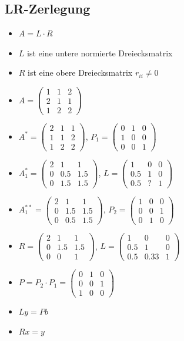 \documentclass[6pt,a4paper]{scrartcl}
\begin{document}
\begin{multicols*}{4}
		\subsection{LR-Zerlegung}	
			\begin{itemize}\itemsep0pt				
				\item $A = L \cdot R$
				\item $L$ ist eine untere normierte Dreiecksmatrix
				\item $R$ ist eine obere Dreiecksmatrix $r_{ii} \neq 0$
				\item $A=\begin{pmatrix}1&1&2\\2&1&1\\1&2&2\end{pmatrix}$
				\item  $A^{*}=\begin{pmatrix}2&1&1\\1&1&2\\1&2&2\end{pmatrix}$, $P_{1}=\begin{pmatrix}0&1&0\\1&0&0\\0&0&1\end{pmatrix}$
				\item $A_{1}^{*}=\begin{pmatrix}2&1&1\\0&0.5&1.5\\0&1.5&1.5\end{pmatrix}$, $L=\begin{pmatrix}1&0&0\\0.5&1&0\\0.5&?&1\end{pmatrix}$
				\item $A_{1}^{**}=\begin{pmatrix}2&1&1\\0&1.5&1.5\\0&0.5&1.5\end{pmatrix}$, $P_{2}=\begin{pmatrix}1&0&0\\0&0&1\\0&1&0\end{pmatrix}$
				\item $R=\begin{pmatrix}2&1&1\\0&1.5&1.5\\0&0&1\end{pmatrix}$, $L=\begin{pmatrix}1&0&0\\0.5&1&0\\0.5&0.33&1\end{pmatrix}$
				\item 	$P = P_{2} \cdot P_{1} = \begin{pmatrix}0&1&0\\0&0&1\\1&0&0\end{pmatrix}$
				\item $Ly = Pb$
				\item $Rx = y$
			\end{itemize}
			

\end{multicols*}
\end{document}
